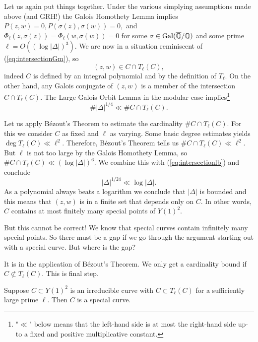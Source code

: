 Let us again put things together. Under the various simplying
assumptions made above (and GRH!) the Galois Homothety Lemma implies $P(z,w)=0, P(\sigma(z),\sigma(w))=0,$
and $\Phi_\ell(z,\sigma(z))=\Phi_\ell(w,\sigma(w))=0$ for some
$\sigma\in\mathrm{Gal}({\overline{\mathbb{Q}}}/{\mathbb{Q}})$ and some prime
$\ell = O((\log|\Delta|)^3)$. We are now in a situation reminiscent of (\ref{eq:intersectionGm}), so
\begin{equation*}
  (z,w) \in C \cap T_\ell(C),  
\end{equation*}
indeed $C$ is defined by an integral polynomial and by the definition of
$T_\ell$.
On the other hand, any Galois conjugate of $(z,w)$ is a member of the
intersection $C\cap T_\ell(C)$. The Large Galois Orbit Lemma in the
modular case implies\footnote{"$\ll$" below means that the left-hand side is
      at most the right-hand side up-to a fixed and positive
      multiplicative constant.}
\begin{equation}
  \label{eq:intersectionlb}
  \#|\Delta|^{1/4} \ll \# C\cap
  T_\ell(C).
\end{equation}

Let us apply B\'ezout's Theorem to estimate the cardinality $\# C\cap
T_\ell(C)$. For this we consider $C$ as fixed and $\ell$ as varying.
Some basic degree estimates yields $\deg T_\ell(C) \ll \ell^2$.
Therefore, B\'ezout's Theorem tells us $\#C\cap T_\ell(C)\ll \ell^2$.
But $\ell$ is not too large by the Galois Homothety Lemma, so
$\# C\cap T_\ell(C)\ll (\log|\Delta|)^6$. 
We combine this with (\ref{eq:intersectionlb}) and conclude
\begin{equation*}
  |\Delta|^{1/24} \ll \log|\Delta|.
\end{equation*}
As a polynomial always  beats a logarithm  we conclude that $|\Delta|$
is bounded and this means that $(z,w)$ is in a finite set that depends
only on $C$. In other words, $C$ contains at most finitely many
special points of $Y(1)^2$.

But this cannot be correct! We
know that special curves contain infinitely many special
points. So there must be a gap if we go through the argument starting
out with a special curve. But where is the gap?

It is
in the application of B\'ezout's Theorem. We only get a cardinality
bound if $C\not\subset T_\ell(C)$. This is final step.

\begin{theorem}[Edixhoven]
  Suppose $C\subset Y(1)^2$ is an irreducible curve with $C\subset
  T_\ell(C)$ for a sufficiently large prime $\ell$. Then $C$ is a
  special curve. 
\end{theorem}

